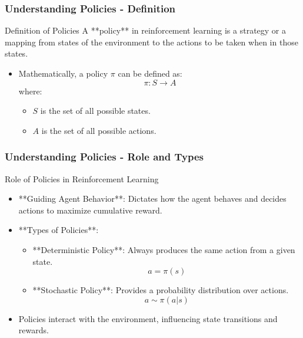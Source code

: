 \documentclass[aspectratio=169]{beamer}
\begin{document}
\begin{frame}[fragile]
    \frametitle{Understanding Policies - Definition}
    \begin{block}{Definition of Policies}
        A **policy** in reinforcement learning is a strategy or a mapping from states of the environment to the actions to be taken when in those states.
    \end{block}
    \begin{itemize}
        \item Mathematically, a policy \( \pi \) can be defined as:
        \begin{equation}
            \pi: S \rightarrow A
        \end{equation}
        where:
        \begin{itemize}
            \item \( S \) is the set of all possible states.
            \item \( A \) is the set of all possible actions.
        \end{itemize}
    \end{itemize}
\end{frame}

\begin{frame}[fragile]
    \frametitle{Understanding Policies - Role and Types}
    \begin{block}{Role of Policies in Reinforcement Learning}
        \begin{itemize}
            \item **Guiding Agent Behavior**: Dictates how the agent behaves and decides actions to maximize cumulative reward.
            \item **Types of Policies**:
            \begin{itemize}
                \item **Deterministic Policy**: Always produces the same action from a given state.
                \begin{equation}
                    a = \pi(s)
                \end{equation}
                \item **Stochastic Policy**: Provides a probability distribution over actions.
                \begin{equation}
                    a \sim \pi(a|s)
                \end{equation}
            \end{itemize}
            \item Policies interact with the environment, influencing state transitions and rewards.
        \end{itemize}
    \end{block}
\end{frame}
\end{document}
